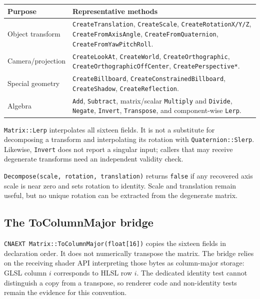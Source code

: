 \begin{center}
\small
\begin{tabular}{@{}p{}p{}@{}}
\toprule
\textbf{Purpose} & \textbf{Representative methods} \\
\midrule
Object transform & \texttt{CreateTranslation}, \texttt{CreateScale},
  \texttt{CreateRotationX/Y/Z}, \texttt{CreateFromAxisAngle},
  \texttt{CreateFromQuaternion}, \texttt{CreateFromYawPitchRoll}. \\
Camera/projection & \texttt{CreateLookAt}, \texttt{CreateWorld},
  \texttt{CreateOrthographic}, \texttt{CreateOrthographicOffCenter},
  \texttt{CreatePerspective*}. \\
Special geometry & \texttt{CreateBillboard}, \texttt{CreateConstrainedBillboard},
  \texttt{CreateShadow}, \texttt{CreateReflection}. \\
Algebra & \texttt{Add}, \texttt{Subtract}, matrix/scalar \texttt{Multiply} and
  \texttt{Divide}, \texttt{Negate}, \texttt{Invert}, \texttt{Transpose}, and
  component-wise \texttt{Lerp}. \\
\bottomrule
\end{tabular}
\end{center}

\texttt{Matrix::Lerp} interpolates all sixteen fields. It is not a substitute for decomposing a
transform and interpolating its rotation with \texttt{Quaternion::Slerp}. Likewise,
\texttt{Invert} does not report a singular input; callers that may receive degenerate transforms
need an independent validity check.

\texttt{Decompose(scale, rotation, translation)} returns \texttt{false} if any recovered axis
scale is near zero and sets rotation to identity. Scale and translation remain useful, but no
unique rotation can be extracted from the degenerate matrix.

\subsection{The ToColumnMajor bridge}

\texttt{CNAEXT Matrix::ToColumnMajor(float[16])} copies the sixteen fields in declaration order.
It does not numerically transpose the matrix. The bridge relies on the receiving shader API
interpreting those bytes as column-major storage: GLSL column $i$ corresponds to HLSL row $i$.
The dedicated identity test cannot distinguish a copy from a transpose, so renderer code and
non-identity tests remain the evidence for this convention.

